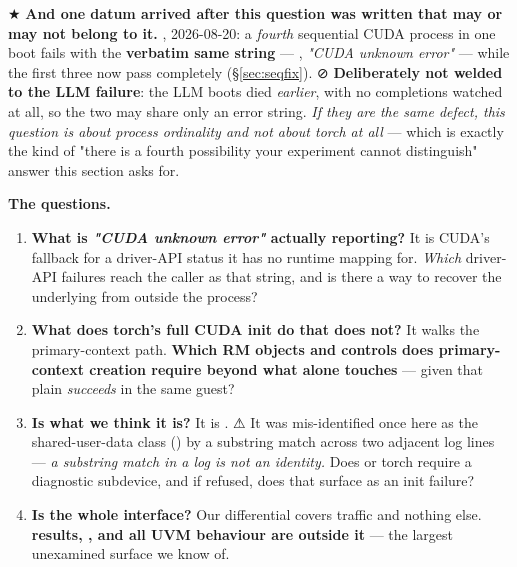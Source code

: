 \documentclass[10.5pt]{article}
\begin{document}
★ \textbf{And one datum arrived after this question was written that may or may not belong to it.}
\measured{} , 2026-08-20: a \emph{fourth} sequential CUDA process in one boot fails
with the \textbf{verbatim same string} --- , \emph{"CUDA unknown error"} ---
while the first three now pass completely (\S\ref{sec:seqfix}). ⊘ \textbf{Deliberately not
welded to the LLM failure}: the LLM boots died \emph{earlier}, with no completions watched at all,
so the two may share only an error string. \emph{If they are the same defect, this question is
about process ordinality and not about torch at all} --- which is exactly the kind of "there is a
fourth possibility your experiment cannot distinguish" answer this section asks for.

\textbf{The questions.}
\begin{enumerate}[itemsep=0.3ex]
\item \textbf{What is \emph{"CUDA unknown error"} actually reporting?} It is CUDA's fallback for a
  driver-API status it has no runtime mapping for. \emph{Which} driver-API failures reach the
  caller as that string, and is there a way to recover the underlying  from
  outside the process?
\item \textbf{What does torch's full CUDA init do that  does not?} It walks
  the primary-context path. \textbf{Which RM objects and controls does primary-context creation
  require beyond what  alone touches} — given that plain
   \emph{succeeds} in the same guest?
\item \textbf{Is  what we think it is?} It is . ⚠ It was
  mis-identified once here as the shared-user-data class () by a substring match
  across two adjacent log lines — \emph{a substring match in a log is not an identity.} Does
   or torch require a diagnostic subdevice, and if refused, does that surface as an
  init failure?
\item \textbf{Is  the whole interface?} Our differential covers 
   traffic and nothing else. \textbf{ results, , 
  and all UVM behaviour are outside it} — the largest unexamined surface we know of.
\end{enumerate}
\end{document}
